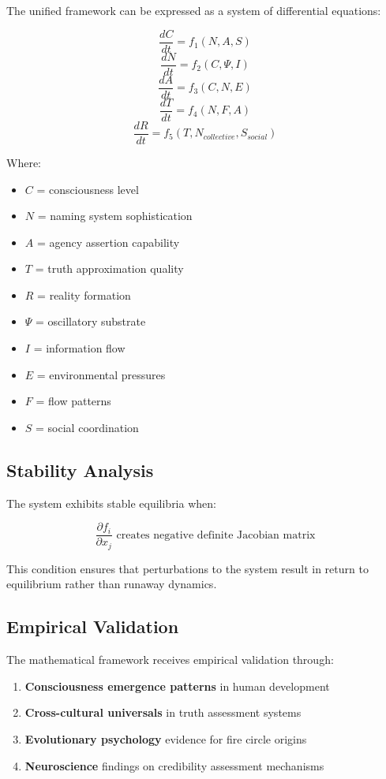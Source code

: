 \documentclass[12pt]{article}
\begin{document}
The unified framework can be expressed as a system of differential equations:

$$\frac{dC}{dt} = f_1(N, A, S)$$
$$\frac{dN}{dt} = f_2(C, \Psi, I)$$
$$\frac{dA}{dt} = f_3(C, N, E)$$
$$\frac{dT}{dt} = f_4(N, F, A)$$
$$\frac{dR}{dt} = f_5(T, N_{collective}, S_{social})$$

Where:
\begin{itemize}
\item $C$ = consciousness level
\item $N$ = naming system sophistication
\item $A$ = agency assertion capability
\item $T$ = truth approximation quality
\item $R$ = reality formation
\item $\Psi$ = oscillatory substrate
\item $I$ = information flow
\item $E$ = environmental pressures
\item $F$ = flow patterns
\item $S$ = social coordination
\end{itemize}

\subsection{Stability Analysis}

The system exhibits stable equilibria when:

$$\frac{\partial f_i}{\partial x_j} \text{ creates negative definite Jacobian matrix}$$

This condition ensures that perturbations to the system result in return to equilibrium rather than runaway dynamics.

\subsection{Empirical Validation}

The mathematical framework receives empirical validation through:

\begin{enumerate}
\item \textbf{Consciousness emergence patterns} in human development
\item \textbf{Cross-cultural universals} in truth assessment systems
\item \textbf{Evolutionary psychology} evidence for fire circle origins
\item \textbf{Neuroscience} findings on credibility assessment mechanisms
\end{enumerate}
\end{document}
